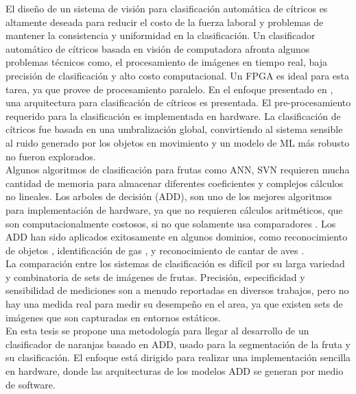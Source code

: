 \documentclass[twoside,spanish,ESP,MSc]{plantillaLabUPV}
\theoremstyle{definition}
\begin{document}



El diseño de un sistema de visión para clasificación automática de cítricos es altamente deseada para reducir el costo de la fuerza laboral y problemas de mantener la consistencia y uniformidad en la clasificación. Un clasificador automático de cítricos basada en visión de computadora afronta algunos problemas técnicos como, el procesamiento de imágenes en tiempo real, baja precisión de clasificación y alto costo computacional. Un FPGA es ideal para esta tarea, ya que provee de procesamiento paralelo.  En el enfoque presentado en \cite{6820292}, una arquitectura para clasificación de cítricos es presentada. El pre-procesamiento requerido para la clasificación es implementada en hardware. La clasificación de cítricos fue basada en una umbralización global, convirtiendo al sistema sensible al ruido generado por los objetos en movimiento y un modelo de ML más robusto no fueron explorados.\\



Algunos algoritmos de clasificación para frutas como ANN, SVN requieren mucha cantidad de memoria para almacenar diferentes coeficientes y complejos cálculos no lineales. Los arboles de decisión (ADD), son uno de los mejores algoritmos para implementación de hardware, ya que no requieren cálculos aritméticos, que son computacionalmente costosos, si no que solamente usa comparadores \cite{6636881}. Los ADD han sido aplicados exitosamente en algunos dominios, como reconocimiento de objetos \cite{10.1007/978-3-540-32256-6_52}, identificación de gas \cite{li}, y reconocimiento de cantar de aves \cite{5986215}.\\



La comparación entre los sistemas de clasificación es difícil por su larga variedad y combinatoria de sets de imágenes de frutas. Precisión, especificidad y sensibilidad de mediciones son a menudo reportadas en diversos trabajos, pero no hay una medida real para medir su desempeño en el area, ya que existen sets de imágenes que son capturadas en entornos estáticos.\\

En esta tesis se propone una metodología para llegar al desarrollo de un clasificador de naranjas basado en ADD, usado para la segmentación de la fruta y su clasificación. El enfoque está dirigido para realizar una implementación sencilla en hardware, donde las arquitecturas de los modelos ADD se generan por medio de software.
\end{document}
